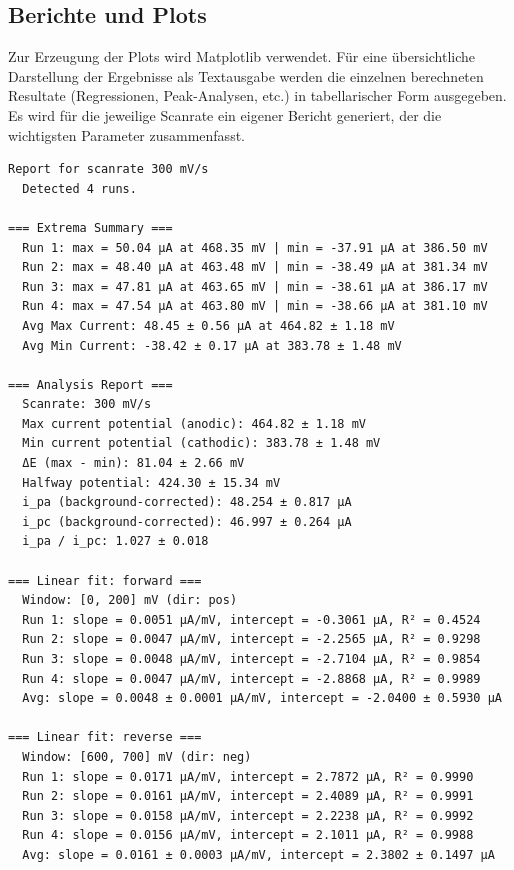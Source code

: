 \subsection{Berichte und Plots}
Zur Erzeugung der Plots wird Matplotlib verwendet.
Für eine übersichtliche Darstellung der Ergebnisse als Textausgabe werden die einzelnen berechneten Resultate (Regressionen, Peak-Analysen, etc.) in tabellarischer Form ausgegeben.
Es wird für die jeweilige Scanrate ein eigener Bericht generiert, der die wichtigsten Parameter zusammenfasst.
\begin{verbatim}
Report for scanrate 300 mV/s 
  Detected 4 runs.

=== Extrema Summary ===
  Run 1: max = 50.04 µA at 468.35 mV | min = -37.91 µA at 386.50 mV
  Run 2: max = 48.40 µA at 463.48 mV | min = -38.49 µA at 381.34 mV
  Run 3: max = 47.81 µA at 463.65 mV | min = -38.61 µA at 386.17 mV
  Run 4: max = 47.54 µA at 463.80 mV | min = -38.66 µA at 381.10 mV
  Avg Max Current: 48.45 ± 0.56 µA at 464.82 ± 1.18 mV
  Avg Min Current: -38.42 ± 0.17 µA at 383.78 ± 1.48 mV

=== Analysis Report ===
  Scanrate: 300 mV/s
  Max current potential (anodic): 464.82 ± 1.18 mV
  Min current potential (cathodic): 383.78 ± 1.48 mV
  ΔE (max - min): 81.04 ± 2.66 mV
  Halfway potential: 424.30 ± 15.34 mV
  i_pa (background-corrected): 48.254 ± 0.817 µA
  i_pc (background-corrected): 46.997 ± 0.264 µA
  i_pa / i_pc: 1.027 ± 0.018

=== Linear fit: forward ===
  Window: [0, 200] mV (dir: pos)
  Run 1: slope = 0.0051 µA/mV, intercept = -0.3061 µA, R² = 0.4524
  Run 2: slope = 0.0047 µA/mV, intercept = -2.2565 µA, R² = 0.9298
  Run 3: slope = 0.0048 µA/mV, intercept = -2.7104 µA, R² = 0.9854
  Run 4: slope = 0.0047 µA/mV, intercept = -2.8868 µA, R² = 0.9989
  Avg: slope = 0.0048 ± 0.0001 µA/mV, intercept = -2.0400 ± 0.5930 µA

=== Linear fit: reverse ===
  Window: [600, 700] mV (dir: neg)
  Run 1: slope = 0.0171 µA/mV, intercept = 2.7872 µA, R² = 0.9990
  Run 2: slope = 0.0161 µA/mV, intercept = 2.4089 µA, R² = 0.9991
  Run 3: slope = 0.0158 µA/mV, intercept = 2.2238 µA, R² = 0.9992
  Run 4: slope = 0.0156 µA/mV, intercept = 2.1011 µA, R² = 0.9988
  Avg: slope = 0.0161 ± 0.0003 µA/mV, intercept = 2.3802 ± 0.1497 µA
\end{verbatim}



